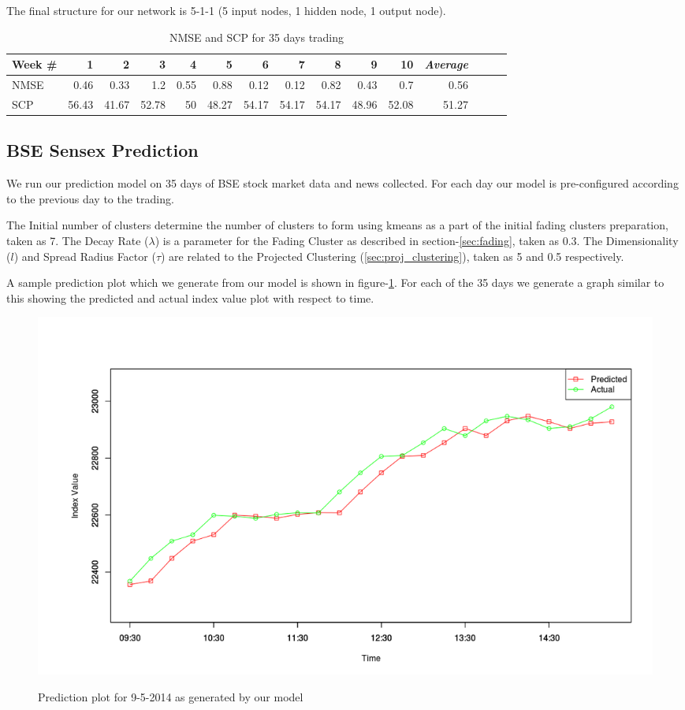 \documentclass[review,twocolumn,5p]{elsarticle}
\begin{document}
The final structure for our network is 5-1-1 (5 input nodes, 1 hidden node, 1 output node).

\begin{table}[ht]
\centering
\caption{NMSE and SCP for 35 days trading}
\label{tab:performance}
\vspace{15pt}
\begin{tabular}{|l|r|r|r|r|r|r|r|r|r|r|r|r|r|r|}
\hline
Week \# & 1 & 2 & 3 & 4 & 5 & 6 & 7 & 8 & 9 & 10 & \textit{Average} \\ \hline
NMSE  & 0.46 & 0.33 & 1.2 & 0.55 & 0.88 & 0.12 & 0.12 & 0.82 & 0.43 & 0.7 & 0.56 \\ \hline
SCP  & 56.43 & 41.67 & 52.78 & 50 & 48.27 & 54.17 & 54.17 & 54.17 & 48.96 & 52.08 & 51.27 \\ \hline
\end{tabular}
\end{table}


\subsection{BSE Sensex Prediction}

We run our prediction model on 35 days of BSE stock market data and news collected. For each day our model is pre-configured according to the previous day to the trading.

The Initial number of clusters determine the number of clusters to form using kmeans as a part of the initial fading clusters preparation, taken as 7. The Decay Rate ($\lambda$) is a parameter for the Fading Cluster as described in section-\ref{sec:fading}, taken as 0.3. The Dimensionality ($l$) and Spread Radius Factor ($\tau$) are related to the Projected Clustering (\ref{sec:proj_clustering}), taken as 5 and 0.5 respectively.




A sample prediction plot which we generate from our model is shown in figure-\ref{fig:error_plot}. For each of the 35 days we generate a graph similar to this showing the predicted and actual index value plot with respect to time.

\begin{figure}[htbp]
\centering
\caption{Prediction plot for 9-5-2014 as generated by our model}
\includegraphics[scale = 0.3]{pictures/predictionResult.png}
\label{fig:error_plot}
\end{figure}
\end{document}
